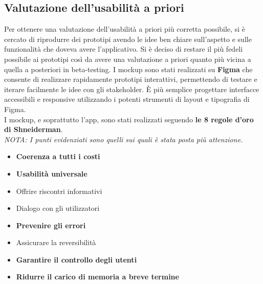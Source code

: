 \documentclass{article}
\begin{document}
		\subsection{Valutazione dell'usabilità a priori}
		Per ottenere una valutazione dell'usabilità a priori più corretta possibile, si è cercato di riprodurre dei prototipi avendo le idee ben chiare sull'aspetto e sulle funzionalità che doveva avere l'applicativo. Si è deciso di restare il più fedeli possibile ai prototipi così da avere una valutazione a priori quanto più vicina a quella a posteriori in beta-testing.
		I mockup sono stati realizzati su \textbf{Figma} che consente di realizzare rapidamente prototipi interattivi, permettendo di testare e iterare facilmente le idee con gli stakeholder.
		È più semplice progettare interfacce accessibili e responsive utilizzando i potenti strumenti di layout e tipografia di Figma.\\
		I mockup, e soprattutto l’app, sono stati realizzati seguendo \textbf{le 8 regole d’oro di Shneiderman}.\\
		\textit{NOTA: I punti evidenziati sono quelli sui quali è stata posta più attenzione.}
		\begin{itemize}
			\item \textbf{Coerenza a tutti i costi}
			\item \textbf{Usabilità universale}
			\item Offrire riscontri informativi
			\item Dialogo con gli utilizzatori
			\item \textbf{Prevenire gli errori}
			\item Assicurare la reversibilità
			\item \textbf{Garantire il controllo degli utenti}
			\item \textbf{Ridurre il carico di memoria a breve termine}
		\end{itemize}
\end{document}
